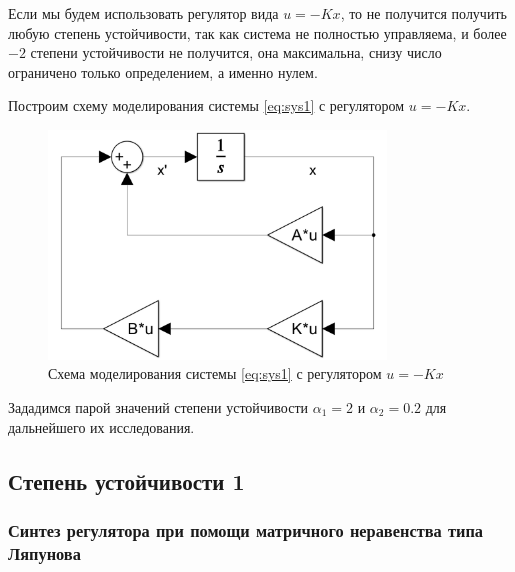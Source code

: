 Если мы будем использовать регулятор вида $u=-Kx$, то не получится получить
любую степень устойчивости, так как система не полностью управляема, и
более $-2$ степени устойчивости не получится, она максимальна, снизу число ограничено 
только определением, а именно нулем.

Построим схему моделирования системы \eqref{eq:sys1} с регулятором $u=-Kx$.
\begin{figure}[H]
    \centering
    \includegraphics[width=0.8\textwidth]{figs/task1_slx.png}
    \caption{Схема моделирования системы \eqref{eq:sys1} с регулятором $u=-Kx$}
    \label{fig:sys1}
\end{figure}

Зададимся парой значений степени устойчивости $\alpha_1=2$ и $\alpha_2=0.2$
для дальнейшего их исследования.



\subsection{Степень устойчивости 1}

\subsubsection{Синтез регулятора при помощи матричного неравенства
типа Ляпунова}

